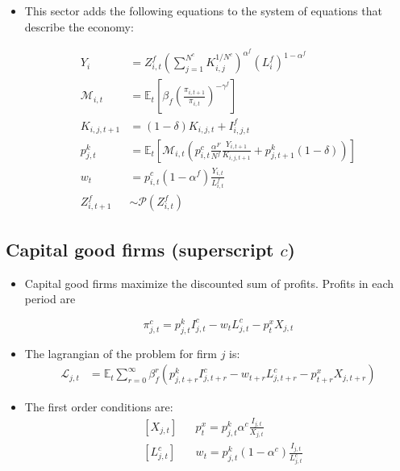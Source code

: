 \documentclass[11pt]{article}
\newcommand{\E}{\mathbb{E}}
\numberwithin{equation}{section}
\begin{document}
\begin{itemize}
\item This sector adds the following equations to the system of equations that describe the economy:

\begin{align}
Y_i & = Z^f_{i,t} \left( \sum_{j=1}^{N^c } K^{1/N^c}_{i,j}\right)^{\alpha^f} \left(L_i^f\right)^{1-\alpha^f}\\
\mathcal{M}_{i,t} & = \E_t \left[ \beta_f \left(\frac{\pi_{i,t+1}}{\pi_{i,t}}\right)^{-\gamma^f} \right] \\
K_{i,j,t+1} & = (1-\delta) K_{i,j,t} + I^f_{i,j,t} \\
 p^k_{j,t} & =\E_t  \left[\mathcal{M}_{i,t} \left( p^c_{i,t} \frac{\alpha^F}{N^f} \frac{Y_{i,t+1}}{K_{i,j,t+1}} +  p^k_{j,t+1} (1-\delta) \right) \right] \\
w_t & = p^c_{i,t} (1-\alpha^f) \frac{Y_{i,t}}{ L^f_{i,t}} \\
Z^f_{i,t+1} & \sim \mathcal{P}(Z^f_{i,t})
\end{align}

\end{itemize}

\subsection{Capital good firms (superscript $c$)}


\begin{itemize}
	
	\item Capital good firms maximize the discounted sum of profits. Profits in each period are
	
	$$\pi^c_{j,t}=p^k_{j,t} I^c_{j,t}-w_{t} L^c_{j,t} - p^x_{t} X_{j,t}  $$
	
	
	
	\item The lagrangian of the problem for firm $j$ is:
	\begin{align*}
	\mathcal{L}_{j,t} &= \E_t \sum_{r=0}^{\infty}\beta^r_f \left(
	p^k_{j,t+r} I^c_{j,t+r}-w_{t+r} L^c_{j,t+r}-p^x_{t+r} X_{j,t+r}  \right)
	\end{align*}
	
	\item The first order conditions are:
	\begin{align}
	& \left[X_{j,t}\right]
	&&
	p^x_{t} = p^k_{j,t} \alpha^c \frac{I_{j,t}}{X_{j,t}}
	\\
	& \left[L^c_{j,t}\right]
	&&
	w_t = p^k_{j,t} (1-\alpha^c) \frac{I_{j,t}}{L^c_{j,t}}
	\end{align}

\end{itemize}
\end{document}

